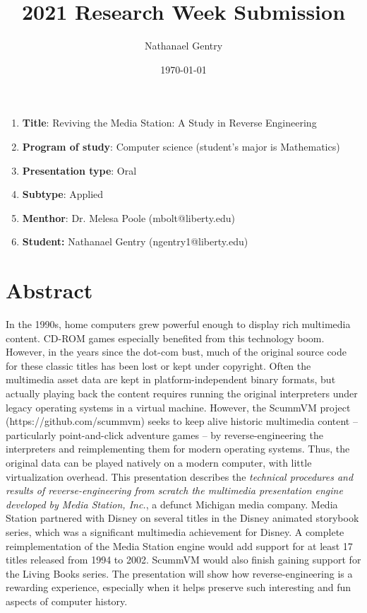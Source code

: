 \documentclass{amsart}
\title{2021 Research Week Submission}
\author{Nathanael Gentry}
\date{\today}
\begin{document}
\maketitle

\begin{enumerate}
\item \textbf{Title}: Reviving the Media Station: A Study in Reverse Engineering
\item \textbf{Program of study}: Computer science (student's major is Mathematics)
\item \textbf{Presentation type}: Oral
\item \textbf{Subtype}: Applied
\item \textbf{Menthor}: Dr. Melesa Poole (mbolt@liberty.edu)
\item \textbf{Student:} Nathanael Gentry (ngentry1@liberty.edu)
\end{enumerate}

\section{Abstract}

In the 1990s, home computers grew powerful enough to display rich multimedia
content. CD-ROM games especially benefited from this technology boom. However,
in the years since the dot-com bust, much of the original source code for these
classic titles has been lost or kept under copyright. Often the multimedia
asset data are kept in platform-independent binary formats, but actually playing
back the content requires running the original interpreters under legacy
operating systems in a virtual machine. However, the ScummVM project
(https://github.com/scummvm) seeks to keep alive historic multimedia content --
particularly point-and-click adventure games -- by reverse-engineering the
interpreters and reimplementing them for modern operating systems. Thus, the
original data can be played natively on a modern computer, with little
virtualization overhead. This presentation describes the \textit{technical
  procedures and results of reverse-engineering from scratch the multimedia
  presentation engine developed by Media Station, Inc.}, a defunct Michigan
media company. Media Station partnered with Disney on several titles in the
Disney animated storybook series, which was a significant multimedia achievement
for Disney. A complete reimplementation of the Media Station engine would add
support for at least 17 titles released from 1994 to 2002. ScummVM would also
finish gaining support for the Living Books series. The presentation will show
how reverse-engineering is a rewarding experience, especially when it helps
preserve such interesting and fun aspects of computer history.
\end{document}
